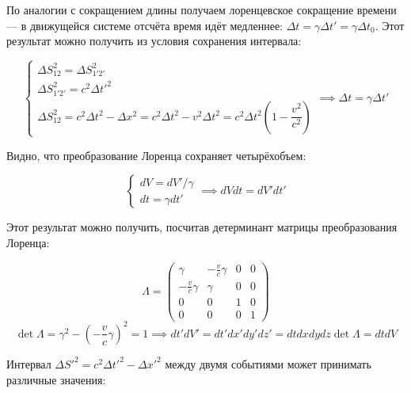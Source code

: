 \documentclass{article}
\begin{document}
По аналогии с сокращением длины получаем лоренцевское сокращение времени --- в движущейся системе отсчёта время идёт медленнее: $\Delta t=\gamma\Delta t'=\gamma\Delta t_0$. Этот результат можно получить из условия сохранения интервала:

\begin{equation*}
    \begin{cases}
    \Delta S_{12}^2=\Delta S_{1'2'}^2\\
    \Delta S_{1'2'}^2=c^2\Delta t'^2\\
    \Delta S_{12}^2=c^2\Delta t^2-\Delta x^2=c^2\Delta t^2-v^2\Delta t^2=c^2\Delta t^2\left(1-\dfrac{v^2}{c^2}\right)
    \end{cases}
    \implies \Delta t=\gamma\Delta t'
\end{equation*}

Видно, что преобразование Лоренца сохраняет четырёхобъем:

\begin{equation*}
    \begin{cases}
    dV=dV'/\gamma\\
    dt=\gamma dt'
    \end{cases}
    \implies dVdt=dV'dt'
\end{equation*}

Этот результат можно получить, посчитав детерминант матрицы преобразования Лоренца:

\begin{equation*}
    \Lambda =
    \begin{pmatrix}
        \gamma & -\frac{v}{c}\gamma & 0 & 0 \\
        -\frac{v}{c}\gamma & \gamma & 0 & 0 \\
        0 & 0 & 1 & 0 \\
        0 & 0 & 0 & 1
    \end{pmatrix}
\end{equation*}
\begin{equation*}
    \det \Lambda = \gamma^2-\left(-\frac{v}{c}\gamma\right)^2=1
    \implies dt'dV'=dt'dx'dy'dz'=dtdxdydz\det\Lambda=dtdV
\end{equation*}

Интервал $\Delta S'^2=c^2\Delta t'^2-\Delta x'^2$ между двумя событиями может принимать различные значения:
\end{document}

